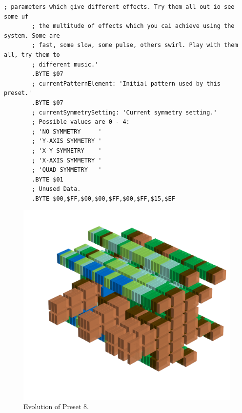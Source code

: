 \begin{lstlisting}[basicstyle=\ttfamily\tiny,caption=Source code for Preset 7.]
        ; parameters which give different effects. Try them all out io see some uf
        ; the multitude of effects which you cai achieve using the system. Some are
        ; fast, some slow, some pulse, others swirl. Play with them all, try them to
        ; different music.'
        .BYTE $07
        ; currentPatternElement: 'Initial pattern used by this preset.'
        .BYTE $07
        ; currentSymmetrySetting: 'Current symmetry setting.'
        ; Possible values are 0 - 4:
        ; 'NO SYMMETRY     '
        ; 'Y-AXIS SYMMETRY '
        ; 'X-Y SYMMETRY    '
        ; 'X-AXIS SYMMETRY '
        ; 'QUAD SYMMETRY   '
        .BYTE $01
        ; Unused Data.
        .BYTE $00,$FF,$00,$00,$FF,$00,$FF,$15,$EF
\end{lstlisting}


\clearpage                                                                 
\begin{figure}[H]                                                          
    \centering                                                             
    \begin{adjustbox}{width=14cm,center}                                   
      \includegraphics[width=14cm]{src/presets/pattern8-45.png}%
    \end{adjustbox}                                                        
\caption{Evolution of Preset 8.}                                           
\end{figure}                                                               
\clearpage                                                                 
                                                                           
